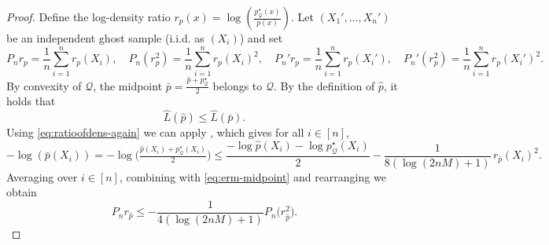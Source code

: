 \documentclass[11pt]{article}
\renewcommand{\le}{\leqslant}
\newcommand{\wh}{\widehat}
\newcommand{\Qs}{\mathcal{Q}}
\renewcommand{\triangleq}{=}
\theoremstyle{definition}
\theoremstyle{remark}
\begin{document}
\begin{proof}
Define the log-density ratio
$
r_p(x)\triangleq \log\left(\frac{p^\star_{\Qs}(x)}{p(x)}\right).
$
Let $(X_1',\dots,X_n')$ be an independent ghost sample (i.i.d. as $(X_i)$) and set
\[
P_n r_p = \frac1n\sum_{i=1}^n r_p(X_i),
\quad
P_n(r_p^2) = \frac1n\sum_{i=1}^n r_p(X_i)^2,
\quad
P_n' r_p = \frac1n\sum_{i=1}^n r_p(X_i'),
\quad
P_n'(r_p^2) = \frac1n\sum_{i=1}^n r_p(X_i')^2.
\]
By convexity of $\Qs$, the midpoint
$
\bar p = \frac{\widehat p+p^\star_{\Qs}}{2}
$
belongs to $\Qs$. By the definition of $\widehat p$, it holds that
\begin{equation}\label{eq:erm-midpoint}
\wh L(\widehat p)\le \wh L(\bar p).
\end{equation}
Using \eqref{eq:ratioofdens-again} we can apply , which gives for all $i \in [n]$,
\[
-\log(\bar{p}(X_i)) = -\log\Big(\tfrac{\widehat p(X_i)+p^\star_{\Qs}(X_i)}{2}\Big)
\le \frac{-\log \widehat p(X_i)-\log p^\star_{\Qs}(X_i)}{2}
-\frac{1}{8(\log(2nM)+1)}\,r_{\widehat p}(X_i)^2.
\]
Averaging over $i\in [n]$, combining with \eqref{eq:erm-midpoint} and rearranging we obtain
\begin{equation}\label{eq:self-bounding}
P_n r_{\widehat p}\le -\frac{1}{4(\log(2nM)+1)}P_n\big(r_{\widehat p}^2\big).
\end{equation}


\end{proof}
\end{document}
